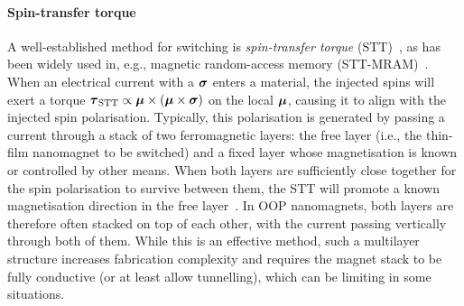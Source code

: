 \paragraph{Spin-transfer torque}
A well-established method for switching  is \emph{spin-transfer torque} (STT)~\cite{SlonczewskiSTT}, as has been widely used in, e.g., magnetic random-access memory (STT-MRAM)~\cite{brataas2012current}.
When an electrical current with a  $\boldsymbol{\mathbf{\sigma}}$ enters a  material, the injected spins will exert a torque $\boldsymbol{\mathbf{\tau}}_\mathrm{STT} \propto \boldsymbol{\mathbf{\mu}} \times (\boldsymbol{\mathbf{\mu}} \times \boldsymbol{\mathbf{\sigma}})$ on the local  $\boldsymbol{\mathbf{\mu}}$, causing it to align with the injected spin polarisation.
Typically, this polarisation is generated by passing a current through a stack of two ferromagnetic layers: the free layer (i.e., the thin-film nanomagnet to be switched) and a fixed layer whose magnetisation is known or controlled by other means.
When both layers are sufficiently close together for the spin polarisation to survive between them, the STT will promote a known magnetisation direction in the free layer~\cite{SOT_FM_AFM,mumax3tutorial}. %
In OOP nanomagnets, both layers are therefore often stacked on top of each other, with the current passing vertically through both of them.
While this is an effective method, such a multilayer structure increases fabrication complexity and requires the magnet stack to be fully conductive (or at least allow tunnelling), which can be limiting in some situations.


